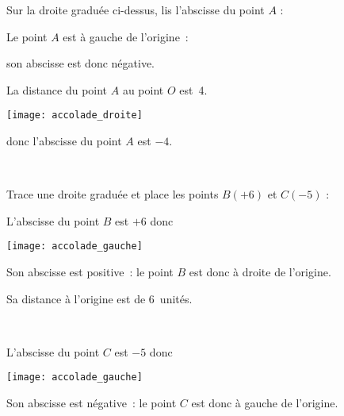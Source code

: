 \vspace{2em}


\begin{methode*1}



\begin{exemple*1}
Sur la droite graduée ci-dessus, lis l'abscisse du point $A$ : \\[1em]
\begin{minipage}[c]{0.4\linewidth}
Le point $A$ est à gauche de l'origine :

son abscisse est donc négative.

La distance du point $A$ au point $O$ est 4.
 \end{minipage} \hfill%
 \begin{minipage}[c]{0.1\linewidth}
 \begin{center}\texttt{[image: accolade\_droite]}\end{center}
  \end{minipage} \hfill%
  \begin{minipage}[c]{0.4\linewidth}
  donc l'abscisse du point $A$ est $-4$.
   \end{minipage} \\
\end{exemple*1}


\begin{exemple*1}
Trace une droite graduée et place les points $B(+6)$ et $C(-5)$ : \\[1em]
\begin{minipage}[c]{0.4\linewidth}
L'abscisse du point $B$ est $+ 6$ donc
 \end{minipage} \hfill%
 \begin{minipage}[c]{0.1\linewidth}
 \begin{center}\texttt{[image: accolade\_gauche]}\end{center}
  \end{minipage} \hfill%
  \begin{minipage}[c]{0.4\linewidth}
  Son abscisse est positive : le point $B$ est donc à droite de l'origine.
  
  Sa distance à l'origine est de 6 unités.
  \end{minipage} \\[0.5em]

\begin{minipage}[c]{0.4\linewidth}
L'abscisse du point $C$ est $-5$ donc
 \end{minipage} \hfill%
 \begin{minipage}[c]{0.1\linewidth}
 \begin{center}\texttt{[image: accolade\_gauche]}\end{center}
  \end{minipage} \hfill%
  \begin{minipage}[c]{0.4\linewidth}
  Son abscisse est négative : le point $C$ est donc à gauche de l'origine. 
  

\end{minipage}
\end{exemple*1}
\end{methode*1}
